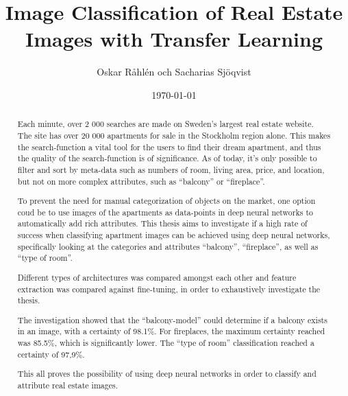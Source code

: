 \documentclass[]{kththesis}
\title{Image Classification of Real Estate Images with Transfer Learning}
\author{Oskar Råhlén och Sacharias Sjöqvist}
\date{\today}
\begin{document}
\frontmatter

\begin{abstract}
  Each minute, over 2 000 searches are made on Sweden’s largest real estate website. The site has over 20 000 apartments for sale in the Stockholm region alone. This makes the search-function a vital tool for the users to find their dream apartment, and thus the quality of the search-function is of significance. As of today, it’s only possible to filter and sort by meta-data such as numbers of room, living area, price, and location, but not on more complex attributes, such as “balcony” or “fireplace”. 
  
  To prevent the need for manual categorization of objects on the market, one option coud be to use images of the apartments as data-points in deep neural networks to automatically add rich attributes. This thesis aims to investigate if a high rate of success when classifying apartment images can be achieved using deep neural networks, specifically looking at the categories and attributes “balcony”, “fireplace”, as well as “type of room”. 
  
  Different types of architectures was compared amongst each other and feature extraction was compared against fine-tuning, in order to exhaustively investigate the thesis.
  
  The investigation showed that the “balcony-model” could determine if a balcony exists in an image, with a certainty of 98.1\%. For fireplaces, the maximum certainty reached was 85.5\%, which is significantly lower. The “type of room” classification reached a certainty of 97,9\%. 
  
  This all proves the possibility of using deep neural networks in order to classify and attribute real estate images.   
\end{abstract}
\end{document}
